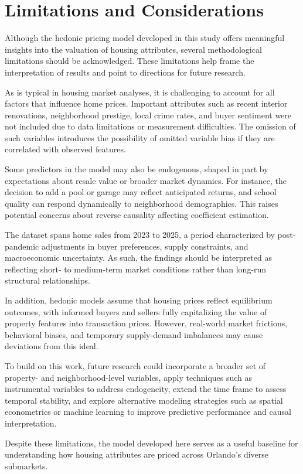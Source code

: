 \section*{Limitations and Considerations}

Although the hedonic pricing model developed in this study offers meaningful insights into the valuation of housing attributes, several methodological limitations should be acknowledged. These limitations help frame the interpretation of results and point to directions for future research.

As is typical in housing market analyses, it is challenging to account for all factors that influence home prices. Important attributes such as recent interior renovations, neighborhood prestige, local crime rates, and buyer sentiment were not included due to data limitations or measurement difficulties. The omission of such variables introduces the possibility of omitted variable bias if they are correlated with observed features.

Some predictors in the model may also be endogenous, shaped in part by expectations about resale value or broader market dynamics. For instance, the decision to add a pool or garage may reflect anticipated returns, and school quality can respond dynamically to neighborhood demographics. This raises potential concerns about reverse causality affecting coefficient estimation.

The dataset spans home sales from 2023 to 2025, a period characterized by post-pandemic adjustments in buyer preferences, supply constraints, and macroeconomic uncertainty. As such, the findings should be interpreted as reflecting short- to medium-term market conditions rather than long-run structural relationships.

In addition, hedonic models assume that housing prices reflect equilibrium outcomes, with informed buyers and sellers fully capitalizing the value of property features into transaction prices. However, real-world market frictions, behavioral biases, and temporary supply-demand imbalances may cause deviations from this ideal.

To build on this work, future research could incorporate a broader set of property- and neighborhood-level variables, apply techniques such as instrumental variables to address endogeneity, extend the time frame to assess temporal stability, and explore alternative modeling strategies such as spatial econometrics or machine learning to improve predictive performance and causal interpretation.

Despite these limitations, the model developed here serves as a useful baseline for understanding how housing attributes are priced across Orlando’s diverse submarkets.
